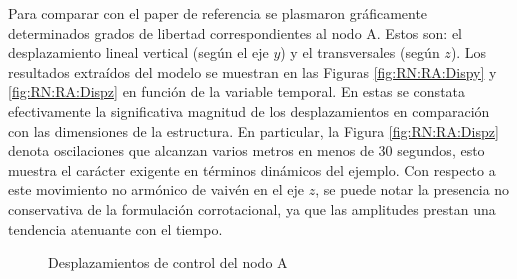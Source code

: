 Para comparar con el paper de referencia se plasmaron gráficamente determinados grados de libertad correspondientes al nodo A. Estos son: el desplazamiento lineal vertical (según el eje $y$) y el transversales (según $z$). Los resultados extraídos del modelo se muestran en las Figuras \ref{fig:RN:RA:Dispy} y \ref{fig:RN:RA:Dispz} en función de la variable temporal. En estas se constata efectivamente la significativa magnitud de los desplazamientos en comparación con las dimensiones de la estructura. En particular, la Figura \ref{fig:RN:RA:Dispz} denota oscilaciones que alcanzan varios metros en menos de 30 segundos, esto muestra el carácter exigente en términos dinámicos del ejemplo. Con respecto a este movimiento no armónico  de vaivén en el eje $z$, se puede notar la presencia no conservativa de la formulación corrotacional, ya que las amplitudes prestan una tendencia atenuante con el tiempo.  

\begingroup
\centering
\begin{figure}[htbp]
	\centering
	\label{fig:RN:RA:DispyA}
	\label{fig:RN:RA:DispzA}
	\caption{Desplazamientos de control del nodo A} \label{fig:RN:RA:DispsA}
\end{figure}
\endgroup


